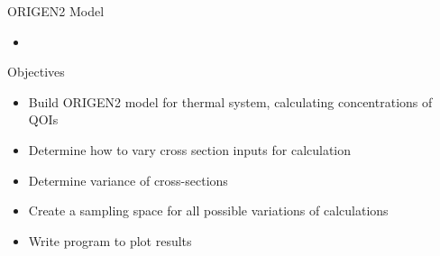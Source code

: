 \documentclass{beamer}
\newcommand{\inputdeckpages}[3]{
\begin{itemize}
\item[]
\end{itemize}
}
\newcommand{\cmark}{\ding{51}}%
\newcommand{\done}{\rlap{$\square$}{\raisebox{2pt}{\large\hspace{1pt}\cmark}}%
  \hspace{-2.5pt}}
\newcommand{\ndone}{\rlap{$\square$}{\raisebox{2pt}{}}%
  \hspace{8pt}}
\begin{document}
\begin{frame}{ORIGEN2 Model}
  \inputdeckpages{../Origen2/TAPE5}{4}{25} %
\end{frame}


\begin{frame}
  \begin{block}{Objectives}
    \vspace{0.3cm}
  \begin{itemize}
  \item[\done]{Build ORIGEN2 model for thermal system, calculating
  concentrations of QOIs}
  \item[\ndone]{Determine how to vary cross section inputs for calculation}
  \item[\ndone]{Determine variance of cross-sections}
  \item[\ndone]{Create a sampling space for all possible variations of
    calculations}
  \item[\ndone]{Write program to plot results}
  \end{itemize}
  \vspace{0.3cm}
\end{block}
\end{frame}
\end{document}
